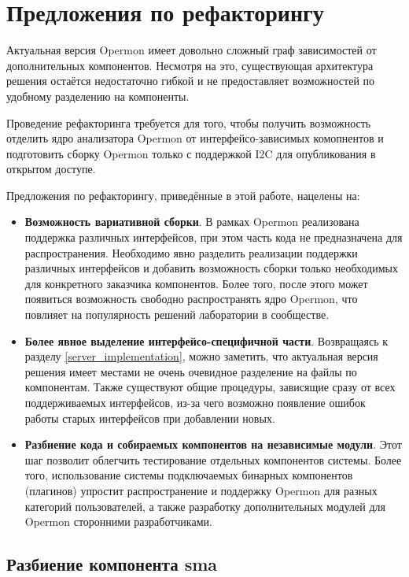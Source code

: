 \section{Предложения по рефакторингу}

\label{refactoring}

Актуальная версия Opermon имеет довольно сложный граф зависимостей от дополнительных компонентов. Несмотря на это, существующая архитектура решения остаётся недостаточно гибкой и не предоставляет возможностей по удобному разделению на компоненты.

Проведение рефакторинга требуется для того, чтобы получить возможность отделить ядро анализатора Opermon от интерфейсо-зависимых комопнентов и подготовить сборку Opermon только с поддержкой I2C для опубликования в открытом доступе.

Предложения по рефакторингу, приведённые в этой работе, нацелены на:

\begin{itemize}
 \item \textbf{Возможность вариативной сборки}. В рамках Opermon реализована поддержка различных интерфейсов, при этом часть кода не предназначена для распространения. Необходимо явно разделить реализации поддержки различных интерфейсов и добавить возможность сборки только необходимых для конкретного заказчика компонентов. Более того, после этого может появиться возможность свободно распространять ядро Opermon, что повлияет на популярность решений лаборатории в сообществе.
 \item \textbf{Более явное выделение интерфейсо-специфичной части}. Возвращаясь к разделу \ref{server_implementation}, можно заметить, что актуальная версия решения имеет местами не очень очевидное разделение на файлы по компонентам. Также существуют общие процедуры, зависящие сразу от всех поддерживаемых интерфейсов, из-за чего возможно появление ошибок работы старых интерфейсов при добавлении новых.
 \item \textbf{Разбиение кода и собираемых компонентов на независимые модули}. Этот шаг позволит облегчить тестирование отдельных компонентов системы. Более того, использование системы подключаемых бинарных компонентов (плагинов) упростит распространение и поддержку Opermon для разных категорий пользователей, а также разработку дополнительных модулей для Opermon сторонними разработчиками.
\end{itemize}

\subsection{Разбиение компонента sma}

